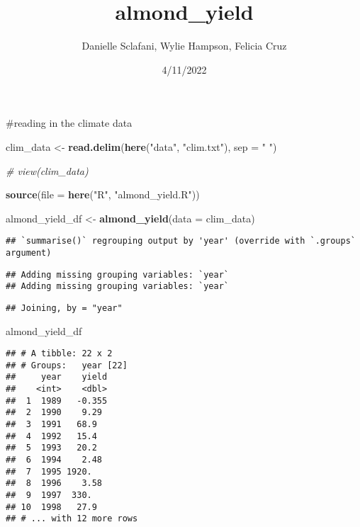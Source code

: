 \documentclass[
]{article}
\title{almond\_yield}
\author{Danielle Sclafani, Wylie Hampson, Felicia Cruz}
\date{4/11/2022}
\newenvironment{Shaded}{\begin{snugshade}}{\end{snugshade}}
\newcommand{\CommentTok}[1]{\textcolor[rgb]{0.56,0.35,0.01}{\textit{#1}}}
\newcommand{\DataTypeTok}[1]{\textcolor[rgb]{0.13,0.29,0.53}{#1}}
\newcommand{\KeywordTok}[1]{\textcolor[rgb]{0.13,0.29,0.53}{\textbf{#1}}}
\newcommand{\NormalTok}[1]{#1}
\newcommand{\StringTok}[1]{\textcolor[rgb]{0.31,0.60,0.02}{#1}}
\begin{document}
\maketitle

\#reading in the climate data

\begin{Shaded}
\begin{Highlighting}[]
\NormalTok{clim_data <-}\StringTok{ }\KeywordTok{read.delim}\NormalTok{(}\KeywordTok{here}\NormalTok{(}\StringTok{"data"}\NormalTok{, }\StringTok{"clim.txt"}\NormalTok{), }\DataTypeTok{sep =} \StringTok{" "}\NormalTok{)}

\CommentTok{# view(clim_data)}
\end{Highlighting}
\end{Shaded}

\begin{Shaded}
\begin{Highlighting}[]
\KeywordTok{source}\NormalTok{(}\DataTypeTok{file =} \KeywordTok{here}\NormalTok{(}\StringTok{"R"}\NormalTok{, }\StringTok{"almond_yield.R"}\NormalTok{))}

\NormalTok{almond_yield_df <-}\StringTok{ }\KeywordTok{almond_yield}\NormalTok{(}\DataTypeTok{data =}\NormalTok{ clim_data)}
\end{Highlighting}
\end{Shaded}

\begin{verbatim}
## `summarise()` regrouping output by 'year' (override with `.groups` argument)
\end{verbatim}

\begin{verbatim}
## Adding missing grouping variables: `year`
## Adding missing grouping variables: `year`
\end{verbatim}

\begin{verbatim}
## Joining, by = "year"
\end{verbatim}

\begin{Shaded}
\begin{Highlighting}[]
\NormalTok{almond_yield_df}
\end{Highlighting}
\end{Shaded}

\begin{verbatim}
## # A tibble: 22 x 2
## # Groups:   year [22]
##     year    yield
##    <int>    <dbl>
##  1  1989   -0.355
##  2  1990    9.29 
##  3  1991   68.9  
##  4  1992   15.4  
##  5  1993   20.2  
##  6  1994    2.48 
##  7  1995 1920.   
##  8  1996    3.58 
##  9  1997  330.   
## 10  1998   27.9  
## # ... with 12 more rows
\end{verbatim}
\end{document}
